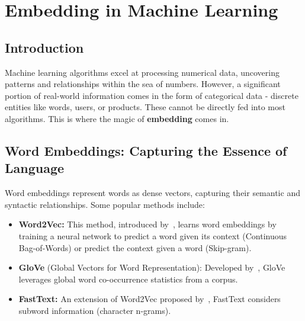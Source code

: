 \chapter{Embedding in Machine Learning}

\section{Introduction}

\noindent
Machine learning algorithms excel at processing numerical data, uncovering patterns and relationships within the sea of numbers. However, a significant portion of real-world information comes in the form of categorical data - discrete entities like words, users, or products. These cannot be directly fed into most algorithms. This is where the magic of \textbf{embedding} comes in.

\section{Word Embeddings: Capturing the Essence of Language}

Word embeddings represent words as dense vectors, capturing their semantic and syntactic relationships. Some popular methods include:

\begin{itemize}[noitemsep]
 \item \textbf{Word2Vec:} This method, introduced by~\cite{mikolov2013efficient}, learns word embeddings by training a neural network to predict a word given its context (Continuous Bag-of-Words) or predict the context given a word (Skip-gram).

 \item \textbf{GloVe} (Global Vectors for Word Representation): Developed by~\cite{pennington2014glove}, GloVe leverages global word co-occurrence statistics from a corpus.

 \item \textbf{FastText:} An extension of Word2Vec proposed by~\cite{bojanowski2017enriching}, FastText considers subword information (character n-grams).
\end{itemize}


